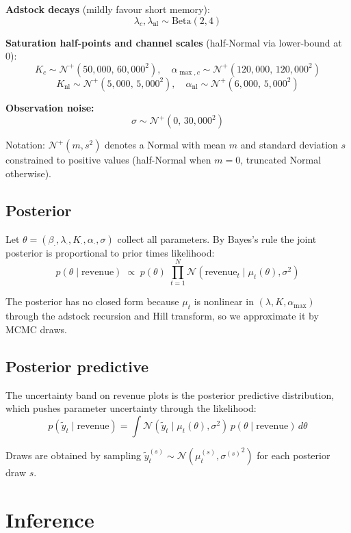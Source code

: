 \documentclass[a4paper,11pt]{article}
\begin{document}
\textbf{Adstock decays} (mildly favour short memory):
$$\lambda_c, \lambda_{\text{nl}} \sim \text{Beta}(2, 4)$$

\textbf{Saturation half-points and channel scales} (half-Normal via lower-bound at 0):
$$K_c \sim \mathcal{N}^{+}(50{,}000,\, 60{,}000^2), \quad \alpha_{\max, c} \sim \mathcal{N}^{+}(120{,}000,\, 120{,}000^2)$$
$$K_{\text{nl}} \sim \mathcal{N}^{+}(5{,}000,\, 5{,}000^2), \quad \alpha_{\text{nl}} \sim \mathcal{N}^{+}(6{,}000,\, 5{,}000^2)$$

\textbf{Observation noise:}
$$\sigma \sim \mathcal{N}^{+}(0,\, 30{,}000^2)$$

Notation: $\mathcal{N}^{+}(m, s^2)$ denotes a Normal with mean $m$ and
standard deviation $s$ constrained to positive values (half-Normal
when $m=0$, truncated Normal otherwise).

\subsection{Posterior}

Let $\theta = (\beta_\cdot, \lambda_\cdot, K_\cdot, \alpha_\cdot, \sigma)$ collect all parameters.
By Bayes's rule the joint posterior is proportional to prior times
likelihood:
$$p(\theta \mid \text{revenue}) \; \propto \; p(\theta) \; \prod_{t=1}^{N} \mathcal{N}(\text{revenue}_t \mid \mu_t(\theta), \sigma^2)$$

The posterior has no closed form because $\mu_t$ is nonlinear in
$(\lambda, K, \alpha_{\max})$ through the adstock recursion and Hill
transform, so we approximate it by MCMC draws.

\subsection{Posterior predictive}

The uncertainty band on revenue plots is the posterior predictive
distribution, which pushes parameter uncertainty through the
likelihood:
$$p(\tilde{y}_t \mid \text{revenue}) = \int \mathcal{N}(\tilde{y}_t \mid \mu_t(\theta), \sigma^2) \, p(\theta \mid \text{revenue}) \, d\theta$$

Draws are obtained by sampling $\tilde{y}_t^{(s)} \sim \mathcal{N}(\mu_t^{(s)}, {\sigma^{(s)}}^2)$
for each posterior draw $s$.

\section{Inference}
\end{document}
